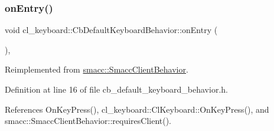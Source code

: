 \mbox{\label{classcl__keyboard_1_1CbDefaultKeyboardBehavior_a06e49d8c78aeffecf74c27b05f529a3a}} 
\subsubsection{\texorpdfstring{on\+Entry()}{onEntry()}}
{\footnotesize\ttfamily void cl\+\_\+keyboard\+::\+Cb\+Default\+Keyboard\+Behavior\+::on\+Entry (\begin{DoxyParamCaption}{ }\end{DoxyParamCaption})\hspace{0.3cm}{\ttfamily [inline]}, {\ttfamily [virtual]}}



Reimplemented from \hyperlink{classsmacc_1_1SmaccClientBehavior_a7962382f93987c720ad432fef55b123f}{smacc\+::\+Smacc\+Client\+Behavior}.



Definition at line 16 of file cb\+\_\+default\+\_\+keyboard\+\_\+behavior.\+h.



References On\+Key\+Press(), cl\+\_\+keyboard\+::\+Cl\+Keyboard\+::\+On\+Key\+Press(), and smacc\+::\+Smacc\+Client\+Behavior\+::requires\+Client().



